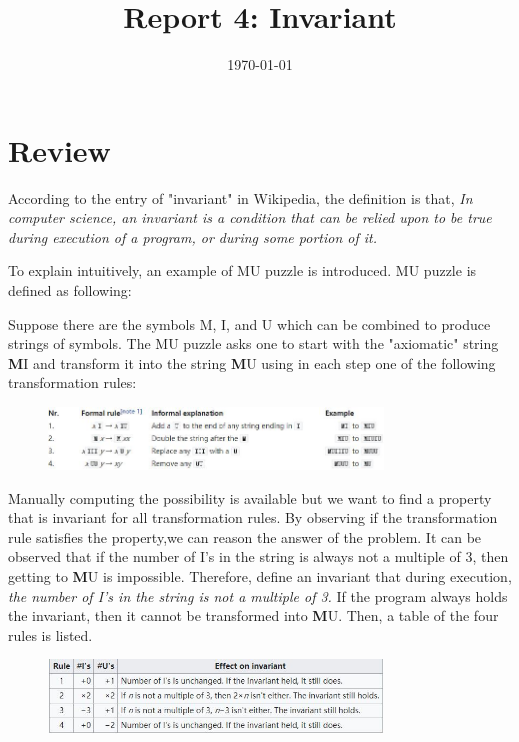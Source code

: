 \documentclass[11pt, conference]{IEEEtran}
\begin{document}
    \title{Report 4: Invariant}
    \author{}
    \date{\today}
    \maketitle

    \section{Review}
        According to the entry of "invariant" in Wikipedia, the definition is that, {\itshape In computer science, an invariant is a condition that can be relied upon to be true during execution of a program, or during some portion of it. }

        To explain intuitively, an example of MU puzzle is introduced. MU puzzle is defined as following:

        Suppose there are the symbols M, I, and U which can be combined to produce strings of symbols. The MU puzzle asks one to start with the "axiomatic" string {\textbf MI} and transform it into the string {\textbf MU} using in each step one of the following transformation rules:
        \begin{figure}[H]
            \centering
            \includegraphics[width=3.5in]{1.jpg}
        \end{figure}

        Manually computing the possibility is available but we want to find a property that is invariant for all transformation rules. By observing if the transformation rule satisfies the property,we can reason the answer of the problem. It can be observed that if the number of I's in the string is always not a multiple of 3, then getting to {\textbf MU} is impossible. Therefore, define an invariant that during execution, {\itshape the number of I's in the string is not a multiple of 3.} If the program always holds the invariant, then it cannot be transformed into {\textbf MU}. Then, a table of the four rules is listed.
        \begin{figure}[H]
            \centering
            \includegraphics[width=3.5in]{2.jpg}
        \end{figure}
\end{document}
